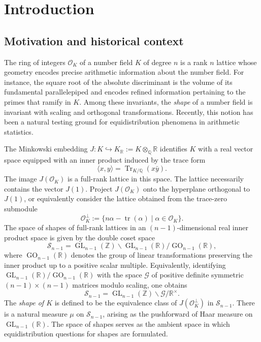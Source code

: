 \documentclass[table]{amsart}
\newcommand{\Z}{\mathbb{Z}}
\newcommand{\Q}{\mathbb{Q}}
\newcommand{\cO}{\mathcal{O}}
\newcommand{\op}[1]{\operatorname{#1}}
\numberwithin{equation}{section}
\begin{document}
\section{Introduction}
\subsection{Motivation and historical context}
The ring of integers $\cO_K$ of a number field $K$ of degree $n$ is a rank $n$ lattice whose geometry encodes precise arithmetic information about the number field. For instance, the square root of the absolute discriminant is the volume of its fundamental parallelepiped and encodes refined information pertaining to the primes that ramify in $K$. Among these invariants, the \emph{shape} of a number field is invariant with scaling and orthogonal transformations. Recently, this notion has been a natural testing ground for equidistribution phenomena in arithmetic statistics.

\par The Minkowski embedding $J: K \hookrightarrow K_{\mathbb{R}}:=K \otimes_{\Q} \mathbb{R}$
identifies $K$ with a real vector space equipped with an inner product induced by the trace form
\[
\langle x,y\rangle = \op{Tr}_{K/\Q}(x\bar y).
\]
The image $J(\cO_K)$ is a full-rank lattice in this space. The lattice necessarily contains the vector $J(1)$. Project $J(\cO_K)$ onto the hyperplane orthogonal to $J(1)$, or equivalently consider the lattice obtained from the trace-zero submodule
\[
\cO_K^\perp := \{ n\alpha - \op{tr}(\alpha) \mid \alpha \in \cO_K \}.
\]
The space of shapes of full-rank lattices in an $(n-1)$-dimensional real inner product space is given by the double coset space
\[
\mathcal{S}_{n-1}
=
\operatorname{GL}_{n-1}(\Z)\backslash
\operatorname{GL}_{n-1}(\mathbb{R})/
\operatorname{GO}_{n-1}(\mathbb{R}),
\]
where $\operatorname{GO}_{n-1}(\mathbb{R})$ denotes the group of linear transformations preserving the inner product up to a positive scalar multiple. Equivalently, identifying $\operatorname{GL}_{n-1}(\mathbb{R})/\operatorname{GO}_{n-1}(\mathbb{R})$ with the space $\mathcal{G}$ of positive definite symmetric $(n-1)\times (n-1)$ matrices modulo scaling, one obtains
\[
\mathcal{S}_{n-1}
=
\operatorname{GL}_{n-1}(\Z)\backslash \mathcal{G}/\mathbb{R}^\times.
\]
The \emph{shape of $K$} is defined to be the equivalence class of $J(\cO_K^\perp)$ in $\mathcal{S}_{n-1}$. There is a natural measure $\mu$ on $\mathcal{S}_{n-1}$, arising as the pushforward of Haar measure on $\operatorname{GL}_{n-1}(\mathbb{R})$. The space of shapes serves as the ambient space in which equidistribution questions for shapes are formulated. 
\end{document}

